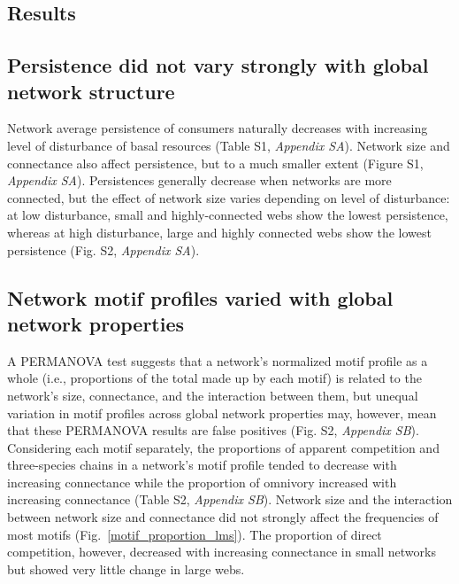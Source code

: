 \documentclass[12pt]{article}
\begin{document}
\begin{spacing}{2.0}
\section*{Results}

    \subsection*{Persistence did not vary strongly with global network structure}
    
        Network average persistence of consumers naturally decreases with increasing level of disturbance of basal resources (Table S1, \emph{Appendix SA}). Network size and connectance also affect persistence, but to a much smaller extent (Figure S1, \emph{Appendix SA}). Persistences generally decrease when networks are more connected, but the effect of network size varies depending on level of disturbance: at low disturbance, small and highly-connected webs show the lowest persistence, whereas at high disturbance, large and highly connected webs show the lowest persistence (Fig. S2, \emph{Appendix SA}).


    \subsection*{Network motif profiles varied with global network properties}

        A PERMANOVA test suggests that a network's normalized motif profile as a whole (i.e., proportions of the total made up by each motif) is related to the network's size, connectance, and the interaction between them, but unequal variation in motif profiles across global network properties may, however, mean that these PERMANOVA results are false positives (Fig. S2, \emph{Appendix SB}).
        Considering each motif separately, the proportions of apparent competition and three-species chains in a network's motif profile tended to decrease with increasing connectance while the proportion of omnivory increased with increasing connectance (Table S2, \emph{Appendix SB}). 
        Network size and the interaction between network size and connectance did not strongly affect the frequencies of most motifs (Fig.~\ref{motif_proportion_lms}). The proportion of direct competition, however, decreased with increasing connectance in small networks but showed very little change in large webs.



\end{spacing}
\end{document}
